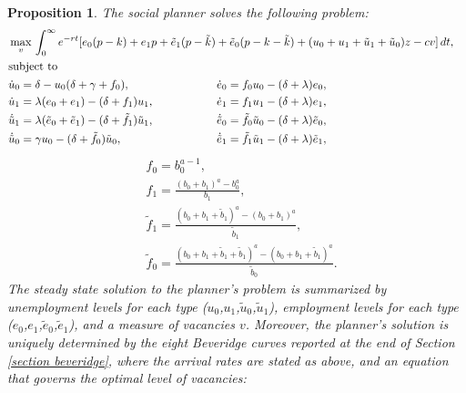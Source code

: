 \documentclass[12pt]{article} %
\newtheorem{proposition}{Proposition}
\theoremstyle{definition}
\begin{document}
\begin{proposition}\label{prop SSPP}
\indent The social planner solves the following problem: 
\begin{align*}
   &\max_{v}
   \begin{aligned}[t]
      &\int_{0}^{\infty} e^{-rt}[e_0(p-k) + e_1p + \tilde{e}_1(p-\tilde{k}) + \tilde{e}_0(p-k-\tilde{k}) +(u_0 + u_1 + \tilde{u}_1 + \tilde{u}_0)z -cv ] \,dt, 
   \end{aligned}  \notag \\
   &\text{subject to} \notag \\
   &\begin{aligned}
   \begin{split}
   & \dot{u}_0 =\delta - u_0(\delta + \gamma + f_0), \\
   & \dot{u}_1 = \lambda(e_0 + e_1) - (\delta + f_1)u_1, \\
   & \dot{\tilde{u}}_1=\lambda( \tilde{e}_0 + \tilde{e}_1) - (\delta + \tilde{f}_1)\tilde{u}_1, \\
   &\dot{\tilde{u}}_0 = \gamma u_0 - (\delta + \tilde{f}_0)\tilde{u}_0, 
   \end{split}
   \hspace{2cm}
   \begin{split}
   &\dot{e}_0 = f_0u_0 - (\delta + \lambda)e_0, \\
   &\dot{e}_1 = f_1u_1 - (\delta + \lambda)e_1, \\
   &\dot{\tilde{e}}_0=\tilde{f}_0\tilde{u}_0 - (\delta + \lambda)\tilde{e}_0, \\
   &\dot{\tilde{e}}_1=\tilde{f}_1\tilde{u}_1 - (\delta + \lambda)\tilde{e}_1, 
   \end{split}
   \end{aligned}
   \end{align*}
      \begin{align*}
   &f_0=b_0^{a-1}, \\
   &f_1=\frac{(b_0 + b_1)^a - b_0^a}{b_1}, \\
   &\tilde{f}_1=\frac{(b_0 + b_1 +\tilde{b}_1)^a - (b_0+b_1)^a}{\tilde{b}_1}, \\
   &\tilde{f}_0=\frac{(b_0 + b_1 + \tilde{b}_1 + \tilde{b}_1)^a - (b_0 + b_1 + \tilde{b}_1)^a}{\tilde{b}_0}.
\end{align*}
The steady state solution to the planner's problem is summarized by unemployment levels for each type ($u_0$,$u_1$,$\tilde{u}_0$,$\tilde{u}_1$), employment levels for each type ($e_0$,$e_1$,$\tilde{e}_0$,$\tilde{e}_1$), and a measure of vacancies $v$. Moreover, the planner's solution is uniquely determined by the eight Beveridge curves reported at the end of Section \ref{section beveridge}, where the arrival rates are stated as above, and an equation that governs the optimal level of vacancies: 

\end{proposition}
\end{document}
